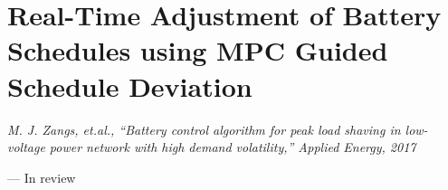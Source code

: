 \chapter{Real-Time Adjustment of Battery Schedules using MPC Guided Schedule Deviation}
\label{ch2}

\singlespacing
\epigraph{\textit{M. J. Zangs, et.al., ``Battery control algorithm for peak load shaving in low-voltage power network with high demand volatility,'' Applied Energy, 2017}}{--- In review}
\doublespacing














